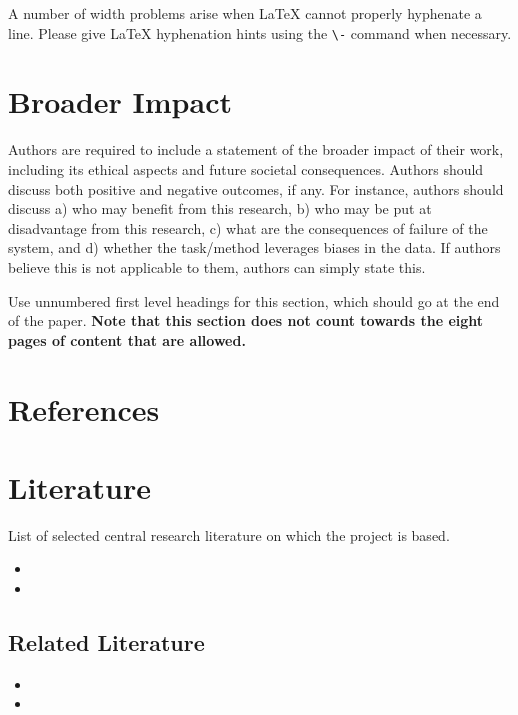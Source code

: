 \documentclass{article}
\begin{document}
A number of width problems arise when \LaTeX{} cannot properly hyphenate a
line. Please give LaTeX hyphenation hints using the \verb+\-+ command when
necessary.


\section*{Broader Impact}

Authors are required to include a statement of the broader impact of their work, including its ethical aspects and future societal consequences. 
Authors should discuss both positive and negative outcomes, if any. For instance, authors should discuss a) 
who may benefit from this research, b) who may be put at disadvantage from this research, c) what are the consequences of failure of the system, and d) whether the task/method leverages
biases in the data. If authors believe this is not applicable to them, authors can simply state this.

Use unnumbered first level headings for this section, which should go at the end of the paper. {\bf Note that this section does not count towards the eight pages of content that are allowed.}


\section*{References}

\section*{Literature}

List of selected central research literature on which the project is based.


\begin{itemize}
  \item {}
  \item {}
\end{itemize}

\subsection{Related Literature}
\begin{itemize}
  \item {}
  \item {}
\end{itemize}


{\small


}
\end{document}
